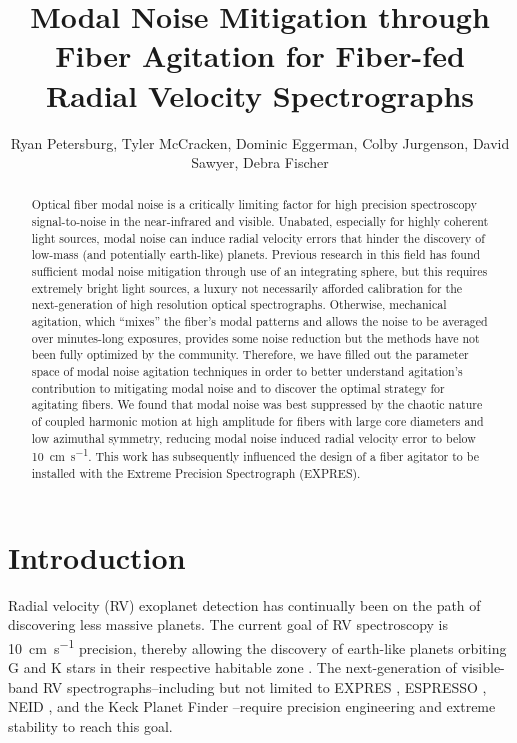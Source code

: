 \documentclass[twocolumn]{emulateapj}
\begin{document}
\title{Modal Noise Mitigation through Fiber Agitation for Fiber-fed Radial Velocity Spectrographs}

\author{Ryan Petersburg, Tyler McCracken, Dominic Eggerman, Colby Jurgenson, David Sawyer, Debra Fischer}

\begin{abstract}

Optical fiber modal noise is a critically limiting factor for high precision spectroscopy signal-to-noise in the near-infrared and visible. Unabated, especially for highly coherent light sources, modal noise can induce radial velocity errors that hinder the discovery of low-mass (and potentially earth-like) planets. Previous research in this field has found sufficient modal noise mitigation through use of an integrating sphere, but this requires extremely bright light sources, a luxury not necessarily afforded calibration for the next-generation of high resolution optical spectrographs. Otherwise, mechanical agitation, which ``mixes'' the fiber's modal patterns and allows the noise to be averaged over minutes-long exposures, provides some noise reduction but the methods have not been fully optimized by the community. Therefore, we have filled out the parameter space of modal noise agitation techniques in order to better understand agitation's contribution to mitigating modal noise and to discover the optimal strategy for agitating fibers. We found that modal noise was best suppressed by the chaotic nature of coupled harmonic motion at high amplitude for fibers with large core diameters and low azimuthal symmetry, reducing modal noise induced radial velocity error to below \SI{10}{\centi\meter\per\second}. This work has subsequently influenced the design of a fiber agitator to be installed with the Extreme Precision Spectrograph (EXPRES).

\end{abstract}


\section{Introduction}
\label{sec:intro}

Radial velocity (RV) exoplanet detection has continually been on the path of discovering less massive planets. The current goal of RV spectroscopy is \SI{10}{\centi\meter\per\second} precision, thereby allowing the discovery of earth-like planets orbiting G and K stars in their respective habitable zone \citep{Fischer2016}. The next-generation of visible-band RV spectrographs--including but not limited to EXPRES \citep{Jurgenson2016}, ESPRESSO \citet{Megevand2012}, NEID \citep{Schwab2016}, and the Keck Planet Finder \citep{Gibson2016}--require precision engineering and extreme stability to reach this goal.
\end{document}
